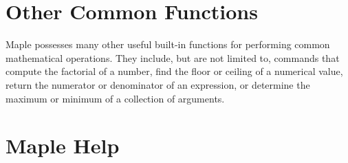 \section{Other Common Functions}

Maple possesses many other useful built-in functions for performing common mathematical operations. They include, but are not limited to, commands that compute the factorial of a number, find the floor or ceiling of a numerical value, return the numerator or denominator of an expression, or determine the maximum or minimum of a collection of arguments.


\begin{multicols}{3}	
\begin{mapleinput}  \end{mapleinput}
\begin{mapleinput}  \end{mapleinput}
\begin{mapleinput}  \end{mapleinput}

\begin{mapleinput}  \end{mapleinput}
\begin{mapleinput}  \end{mapleinput}
\begin{mapleinput}  \end{mapleinput}
\begin{mapleinput}  \end{mapleinput}

\vfill\null
\end{multicols}

\section{Maple Help}

